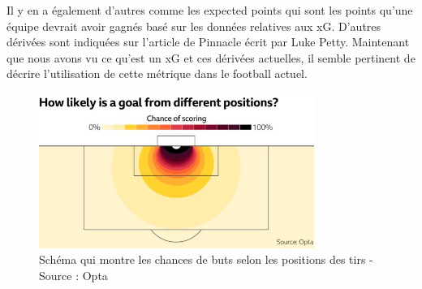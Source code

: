 \documentclass[12pt]{article}
\begin{document}
Il y en a également d'autres comme les expected points qui sont les points qu'une équipe devrait avoir gagnés basé sur les données relatives aux xG. D'autres dérivées sont indiquées sur l'article de Pinnacle écrit par Luke Petty. \cite{pettyWhatExpectedGoals2018a}
\newline\newline
Maintenant que nous avons vu ce qu'est un xG et ces dérivées actuelles, il semble pertinent de décrire l'utilisation de cette métrique dans le football actuel.

\begin{figure}[htp]
    \centering
    \includegraphics[width=0.8\textwidth]{img/SchemaXG.jpeg}

    \caption{Schéma qui montre les chances de buts selon les positions des tirs - Source : Opta}
    \label{fig:shotmap}
\end{figure}
\end{document}
